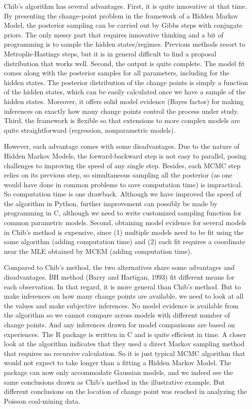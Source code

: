 \documentclass{article}
\begin{document}
Chib's algorithm has several advantages. First, it is quite innovative
at that time. By presenting the change-point problem in the framework of
a Hidden Markov Model, the posterior sampling can be carried out by
Gibbs steps with conjugate priors. The only messy part that requires
innovative thinking and a bit of programming is to sample the hidden
states/regimes. Previous methods resort to Metroplis-Hastings steps, but
it is in general difficult to find a proposal distribution that works
well. Second, the output is quite complete. The model fit comes along
with the posterior samples for all parameters, including for the hidden
states. The posterior distribution of the change points is simply a
function of the hidden states, which can be easily calculated once we
have a sample of the hidden states. Moreover, it offers solid model
evidence (Bayes factor) for making inferences on exactly how many change
points control the process under study. Third, the framework is flexible
so that extensions to more complex models are quite straightforward
(regression, nonparametric models).

However, each advantage comes with some disadvantages. Due to the nature
of Hidden Markov Models, the forward-backward step is not easy to
parallel, posing challenges to improving the speed of any single step.
Besides, each MCMC step relies on its previous step, so simultaneous
sampling all the posterior (as one would have done in common problems to
save computation time) is impractical. So computation time is one
drawback. Although we have improved the speed of the algorithm in
Python, further improvement can possibly be made by programming in C,
although we need to write customized sampling function for common
parametric models. Second, obtaining model evidence for several models
in Chib's method is expensive, since (1) multiple models need to be fit
using the same algorithm (adding computation time) and (2) each fit
requires a coordinate near the MLE obtained by MCEM (adding computation
time).

Compared to Chib's method, the two alternatives share some advantages
and disadvantages. BH method (Barry and Hartigan, 1993) fit different
means for each observation. In that regard, it is more general than
Chib's method. But to make inferences on how many change points are
available, we need to look at all the values and make subjective
inferences. No model evidence is available from the algorithm so we
cannot compare across models with different number of change points. And
any inferences drawn for model comparisons are based on experiences. The
R package is written in C and is quite efficient in time. A closer look
at the algorithm indicates that they used a direct Markov sampling
method that requires no recursive calculation. So it is just typical
MCMC algorithm that would not expect to take longer than a fitting a
Hidden Markov Model. The package can now only accommodate Gaussian
models, and we indeed see the same conclusions drawn as Chib's method in
the illustrative example. But different conclusions on the location of
change point was reached in analyzing the Poisson coal-mining data.
\end{document}
